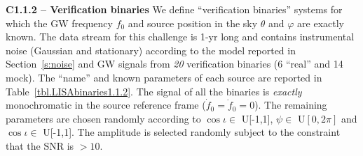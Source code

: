 \documentclass[11pt]{report}
\begin{document}
\begin{description}
\item {\bf C1.1.2 -- Verification binaries} We define ``verification binaries'' systems for which the GW frequency $f_0$ and source position in the sky $\theta$ and $\varphi$ are exactly known. The data stream for this challenge is 1-yr long and contains instrumental noise (Gaussian and stationary) according to the model reported in Section~\ref{s:noise} and GW signals from {\em 20} verification binaries (6 ``real'' and 14 mock). The ``name'' and known parameters of each source are reported in Table~\ref{tbl.LISAbinaries1.1.2}. The signal of all the binaries is {\em exactly} monochromatic in the source reference frame ($\dot{f}_0 = \ddot{f}_0 = 0$). The remaining parameters are chosen randomly according to $\cos\iota\in$ U[-1,1], $\psi \in$ U$[0,2\pi]$ and $\cos\iota\in$ U[-1,1]. The amplitude is selected randomly subject to the constraint that the SNR is $> 10$.



\end{description}
\end{document}
